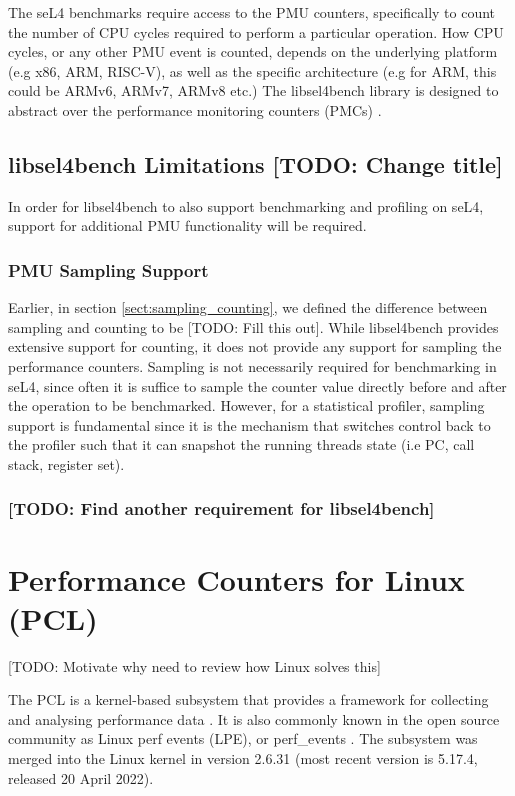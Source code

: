 The seL4 benchmarks require access to the PMU counters, specifically to count the number of CPU cycles required to perform a particular operation. How CPU cycles, or any other PMU event is counted, depends on the underlying platform (e.g x86, ARM, RISC-V), as well as the specific architecture (e.g for ARM, this could be ARMv6, ARMv7, ARMv8 etc.) The libsel4bench library is designed to abstract over the performance monitoring counters (PMCs) \cite{github_libsel4bench_sel4bench_header}.

\subsection{libsel4bench Limitations [TODO: Change title]}

In order for libsel4bench to also support benchmarking and profiling on seL4, support for additional PMU functionality will be required. 

\subsubsection{PMU Sampling Support}
Earlier, in section \ref{sect:sampling_counting}, we defined the difference between sampling and counting to be [TODO: Fill this out]. While libsel4bench provides extensive support for counting, it does not provide any support for sampling the performance counters. Sampling is not necessarily required for benchmarking in seL4, since often it is suffice to sample the counter value directly before and after the operation to be benchmarked. However, for a statistical profiler, sampling support is fundamental since it is the mechanism that switches control back to the profiler such that it can snapshot the running threads state (i.e PC, call stack, register set).

\subsubsection{[TODO: Find another requirement for libsel4bench]}

\section{Performance Counters for Linux (PCL)}\label{sect:pcl}

[TODO: Motivate why need to review how Linux solves this]

The PCL is a kernel-based subsystem that provides a framework for collecting and analysing performance data \cite{DocsRedHatPCL}. It is also commonly known in the open source community as Linux perf events (LPE), or perf\_events \cite{BlogBrendandGreggPerf}. The subsystem was merged into the Linux kernel in version 2.6.31 \cite{DocsUnofficialLinxPerfEvents} (most recent version is 5.17.4, released 20 April 2022). 

